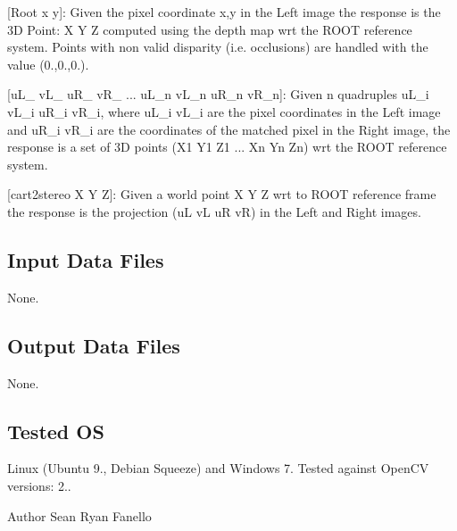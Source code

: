 \begin{DoxyItemize}
\begin{DoxyItemize}
\item \mbox{[}Root x y\mbox{]}\+: Given the pixel coordinate x,y in the Left image the response is the 3\+D Point\+: X Y Z computed using the depth map wrt the R\+O\+O\+T reference system. Points with non valid disparity (i.\+e. occlusions) are handled with the value (0.,0.,0.).
\item \mbox{[}u\+L\+\_ v\+L\+\_ u\+R\+\_ v\+R\+\_ ... u\+L\+\_\+n v\+L\+\_\+n u\+R\+\_\+n v\+R\+\_\+n\mbox{]}\+: Given n quadruples u\+L\+\_\+i v\+L\+\_\+i u\+R\+\_\+i v\+R\+\_\+i, where u\+L\+\_\+i v\+L\+\_\+i are the pixel coordinates in the Left image and u\+R\+\_\+i v\+R\+\_\+i are the coordinates of the matched pixel in the Right image, the response is a set of 3\+D points (X1 Y1 Z1 ... Xn Yn Zn) wrt the R\+O\+O\+T reference system.
\item \mbox{[}cart2stereo X Y Z\mbox{]}\+: Given a world point X Y Z wrt to R\+O\+O\+T reference frame the response is the projection (u\+L v\+L u\+R v\+R) in the Left and Right images.
\end{DoxyItemize}
\end{DoxyItemize}\hypertarget{group__SFM_in_files_sec}{}\subsection{Input Data Files}\label{group__SFM_in_files_sec}
None.\hypertarget{group__SFM_out_data_sec}{}\subsection{Output Data Files}\label{group__SFM_out_data_sec}
None.\hypertarget{group__SFM_tested_os_sec}{}\subsection{Tested O\+S}\label{group__SFM_tested_os_sec}
Linux (Ubuntu 9., Debian Squeeze) and Windows 7. Tested against Open\+C\+V versions\+: 2..

\begin{DoxyAuthor}{Author}
Sean Ryan Fanello 
\end{DoxyAuthor}
